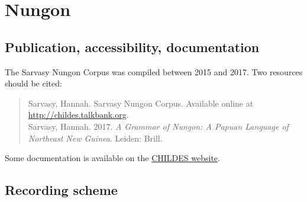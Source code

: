 \documentclass[a4paper, 11pt]{book}
\begin{document}
%
%
%


\section{Nungon}
\label{sec:Nungon}

\subsection{Publication, accessibility, documentation}
The Sarvasy Nungon Corpus \citep{Sarvasy2017a, Sarvasy2017b} was compiled between 2015 and 2017. Two resources should be cited: 

\begin{quote}
	Sarvasy, Hannah. Sarvasy Nungon Corpus. Available online at \href{http://childes.talkbank.org/access/Other/Nungon/Sarvasy.html}{http://childes.talkbank.org}. \\ %
	Sarvasy, Hannah. 2017. \emph{A Grammar of Nungon: A Papuan Language of Northeast New Guinea}. Leiden: Brill. %
\end{quote}

Some documentation is available on the \href{http://childes.talkbank.org/access/Other/Nungon/Sarvasy.html}{CHILDES website}. 

\subsection{Recording scheme}
\end{document}
